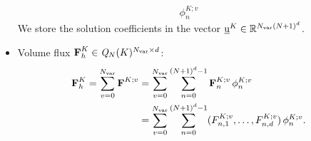 \documentclass{scrreprt}
\theoremstyle{definition}
\theoremstyle{nonumberplain}
\renewcommand{\vec}[1]{{\textbf{#1}}}
\newcommand{\laVec}[1]{\underline{\mathrm{#1}}}
\newcommand{\laMat}[1]{\underline{\mathrm{#1}}}
\newcommand{\cell}{K}
\newcommand{\polyspace}[3]{\mathit{#1}_{#2}(#3)}
\begin{document}
\begin{itemize}
\begin{align*}
\phi^{\cell;v}_{n}
\end{align*}
We store the solution coefficients in the vector
$\laVec{u}^\cell\in\mathbb{R}^{N_\textup{var}(N+1)^{d}}$.
\item Volume flux
$\vec{F}_h^{\cell}\in\polyspace{Q}{N}{\cell}^{N_\textup{var}\times d}$:
\begin{align*}
\vec{F}_h^\cell
=
\sum_{v=0}^{N_\textup{var}}
\vec{F}^{K;v}
&=
\sum_{v=0}^{N_\textup{var}}
\sum_{n=0}^{(N+1)^d-1}
\vec{F}^{K;v}_{n}\,{\phi}^{K;v}_{n} \\
&=
\sum_{v=0}^{N_\textup{var}}
\sum_{n=0}^{(N+1)^d-1}
(F^{K;v}_{n,1},\ldots,F^{K;v}_{n,d})\,{\phi}^{K;v}_{n}.
\end{align*}
\end{itemize}
\end{document}
